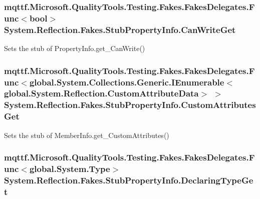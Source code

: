 \hypertarget{class_system_1_1_reflection_1_1_fakes_1_1_stub_property_info_a8d756942cb6f63843452570a2b99b5b2}{
\subsubsection[{Can\-Write\-Get}]{\setlength{\rightskip}{0pt plus 5cm}mqttf.\-Microsoft.\-Quality\-Tools.\-Testing.\-Fakes.\-Fakes\-Delegates.\-Func$<$bool$>$ System.\-Reflection.\-Fakes.\-Stub\-Property\-Info.\-Can\-Write\-Get}}\label{class_system_1_1_reflection_1_1_fakes_1_1_stub_property_info_a8d756942cb6f63843452570a2b99b5b2}


Sets the stub of Property\-Info.\-get\-\_\-\-Can\-Write()

\hypertarget{class_system_1_1_reflection_1_1_fakes_1_1_stub_property_info_af2c8602d78be31a7b31f1b18b87874fa}{
\subsubsection[{Custom\-Attributes\-Get}]{\setlength{\rightskip}{0pt plus 5cm}mqttf.\-Microsoft.\-Quality\-Tools.\-Testing.\-Fakes.\-Fakes\-Delegates.\-Func$<$global.\-System.\-Collections.\-Generic.\-I\-Enumerable$<$global.\-System.\-Reflection.\-Custom\-Attribute\-Data$>$ $>$ System.\-Reflection.\-Fakes.\-Stub\-Property\-Info.\-Custom\-Attributes\-Get}}\label{class_system_1_1_reflection_1_1_fakes_1_1_stub_property_info_af2c8602d78be31a7b31f1b18b87874fa}


Sets the stub of Member\-Info.\-get\-\_\-\-Custom\-Attributes()

\hypertarget{class_system_1_1_reflection_1_1_fakes_1_1_stub_property_info_a69ccec60eb0f74eccfdbc44f0a3f3f2e}{
\subsubsection[{Declaring\-Type\-Get}]{\setlength{\rightskip}{0pt plus 5cm}mqttf.\-Microsoft.\-Quality\-Tools.\-Testing.\-Fakes.\-Fakes\-Delegates.\-Func$<$global.\-System.\-Type$>$ System.\-Reflection.\-Fakes.\-Stub\-Property\-Info.\-Declaring\-Type\-Get}}\label{class_system_1_1_reflection_1_1_fakes_1_1_stub_property_info_a69ccec60eb0f74eccfdbc44f0a3f3f2e}


